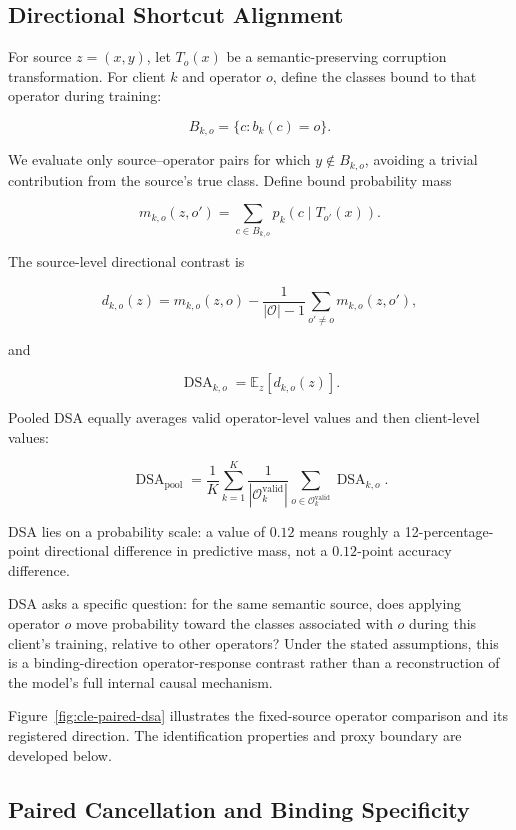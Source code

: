 \subsection{Directional Shortcut Alignment}

For source \(z=(x,y)\), let \(T_o(x)\) be a semantic-preserving corruption transformation. For client \(k\) and operator \(o\), define the classes bound to that operator during training:

\[
B_{k,o}=\{c:b_k(c)=o\}.
\]

We evaluate only source--operator pairs for which \(y\notin B_{k,o}\), avoiding a trivial contribution from the source's true class. Define bound probability mass

\[
m_{k,o}(z,o')=\sum_{c\in B_{k,o}}p_k(c\mid T_{o'}(x)).
\]

The source-level directional contrast is

\[
d_{k,o}(z)=m_{k,o}(z,o)
-\frac{1}{|\mathcal O|-1}\sum_{o'\neq o}m_{k,o}(z,o'),
\]

and

\[
\operatorname{DSA}_{k,o}=\mathbb E_z[d_{k,o}(z)].
\]

Pooled DSA equally averages valid operator-level values and then client-level values:

\[
\operatorname{DSA}_{\mathrm{pool}}
=\frac1K\sum_{k=1}^{K}
\frac1{|\mathcal O_k^{\mathrm{valid}}|}
\sum_{o\in\mathcal O_k^{\mathrm{valid}}}\operatorname{DSA}_{k,o}.
\]

DSA lies on a probability scale: a value of \(0.12\) means roughly a 12-percentage-point directional difference in predictive mass, not a \(0.12\)-point accuracy difference.

DSA asks a specific question: for the same semantic source, does applying operator \(o\) move probability toward the classes associated with \(o\) during this client's training, relative to other operators? Under the stated assumptions, this is a binding-direction operator-response contrast rather than a reconstruction of the model's full internal causal mechanism.

Figure~\ref{fig:cle-paired-dsa} illustrates the fixed-source operator comparison and its registered direction. The identification properties and proxy boundary are developed below.

\subsection{Paired Cancellation and Binding Specificity}


